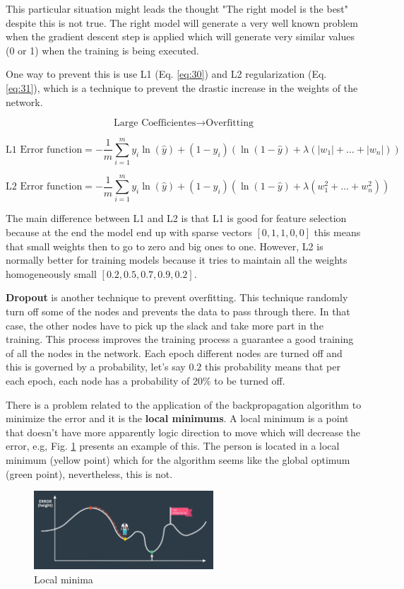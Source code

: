\documentclass{article}
\begin{document}
This particular situation might leads the thought "The right model is the best" despite this is not true. The right model will generate a very well known problem when the gradient descent step is applied which will generate very similar values (0 or 1) when the training is being executed.

One way to prevent this is use L1 (Eq. \eqref{eq:30}) and L2 regularization (Eq. \eqref{eq:31}), which is a technique to prevent the drastic increase in the weights of the network.

\[\text{Large Coefficientes} \rightarrow \text{Overfitting}\]

\begin{equation}
\label{eq:30}
\text{L1 Error function} = - \frac{1}{m} \sum_{i=1}^m y_i\ln{(\hat{y})} + (1 - y_i) (\ln{(1 - \hat{y})} + \lambda (|w_1|+\dots+|w_n|))
\end{equation}

\begin{equation}
\label{eq:31}
\text{L2 Error function} = - \frac{1}{m} \sum_{i=1}^m y_i\ln{(\hat{y})} + (1 - y_i) (\ln{(1 - \hat{y})} + \lambda (w_1^2+\dots+w_n^2))
\end{equation}

The main difference between L1 and L2 is that L1 is good for feature selection because at the end the model end up with sparse vectors \([0,1,1,0,0]\) this means that small weights then to go to zero and big ones to one. However, L2 is normally better for training models because it tries to maintain all the weights homogeneously small \([0.2, 0.5, 0.7 ,0.9, 0.2]\).

\textbf{Dropout} is another technique to prevent overfitting. This technique randomly turn off some of the nodes and prevents the data to pass through there. In that case, the other nodes have to pick up the slack and take more part in the training. This process improves the training process a guarantee a good training of all the nodes in the network. Each epoch different nodes are turned off and this is governed by a probability, let's say \(0.2\) this probability means that per each epoch, each node has a probability of 20\% to be turned off. 

There is a problem related to the application of the backpropagation algorithm to minimize the error and it is the \textbf{local minimums}. A local minimum is a point that doesn't have more apparently logic direction to move which will decrease the error, e.g, Fig. \ref{fig:f38} presents an example of this. The person is located in a local minimum (yellow point) which for the algorithm seems like the global optimum (green point), nevertheless, this is not.

\begin{figure}[ht]
    \centering
    \includegraphics[width=0.6\textwidth,height=0.6\textheight,keepaspectratio]{images/minima.png}
    \captionsetup{justification=centering}
    \caption{Local minima}
    \label{fig:f38}
\end{figure}

\printbibliography
\end{document}
